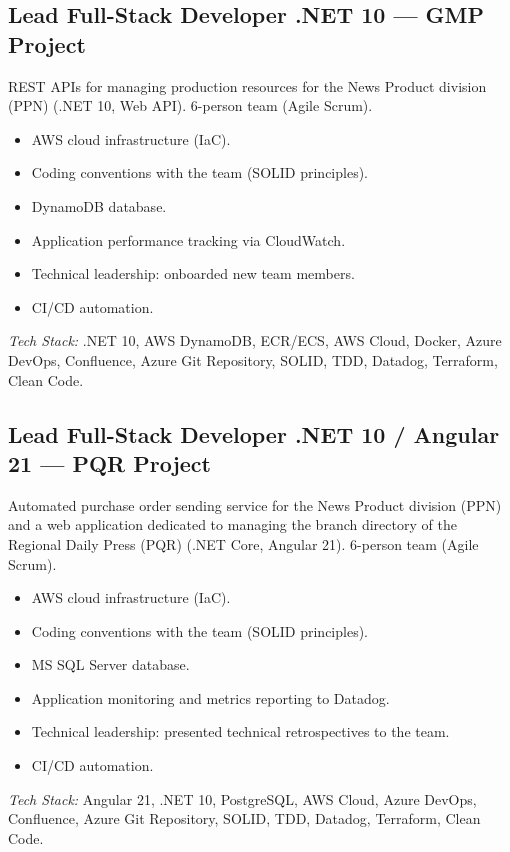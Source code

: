 \documentclass[10pt,a4paper]{article}
\begin{document}
\vspace{6pt}

\subsection*{Lead Full-Stack Developer .NET 10 --- GMP Project}
\color{darkgray}
REST APIs for managing production resources for the News Product division (PPN) (.NET 10, Web API). 6-person team (Agile Scrum).
\begin{itemize}
  \item AWS cloud infrastructure (IaC).
  \item Coding conventions with the team (SOLID principles).
  \item DynamoDB database.
  \item Application performance tracking via CloudWatch.
  \item Technical leadership: onboarded new team members.
  \item CI/CD automation.
\end{itemize}
\textit{Tech Stack:} .NET 10, AWS DynamoDB, ECR/ECS, AWS Cloud, Docker, Azure DevOps, Confluence, Azure Git Repository, SOLID, TDD, Datadog, Terraform, Clean Code.

\vspace{6pt}

\subsection*{Lead Full-Stack Developer .NET 10 / Angular 21 --- PQR Project}
\color{darkgray}
Automated purchase order sending service for the News Product division (PPN) and a web application dedicated to managing the branch directory of the Regional Daily Press (PQR) (.NET Core, Angular 21). 6-person team (Agile Scrum).
\begin{itemize}
  \item AWS cloud infrastructure (IaC).
  \item Coding conventions with the team (SOLID principles).
  \item MS SQL Server database.
  \item Application monitoring and metrics reporting to Datadog.
  \item Technical leadership: presented technical retrospectives to the team.
  \item CI/CD automation.
\end{itemize}
\textit{Tech Stack:} Angular 21, .NET 10, PostgreSQL, AWS Cloud, Azure DevOps, Confluence, Azure Git Repository, SOLID, TDD, Datadog, Terraform, Clean Code.
\end{document}
